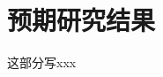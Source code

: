 \documentclass{wreport}
\begin{document}
\section{预期研究结果}%
这部分写xxx


\myreference %

\end{document}
